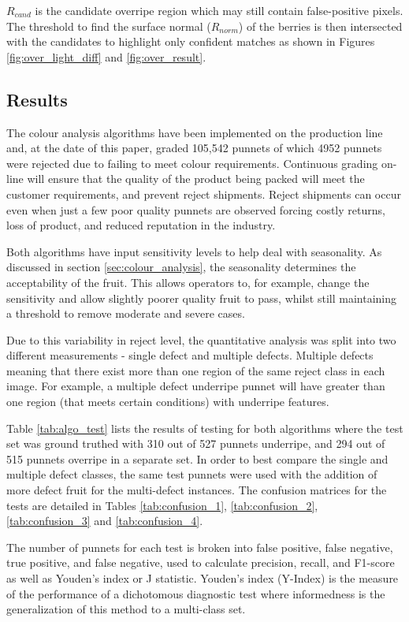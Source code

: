 \documentclass[fleqn,twoside]{article}
\begin{document}
$R_{cand}$ is the candidate overripe region which may still contain false-positive pixels. The threshold to find the surface normal ($R_{norm}$) of the berries is then intersected with the candidates to highlight only confident matches as shown in Figures \ref{fig:over_light_diff} and \ref{fig:over_result}.


\subsection{Results}


The colour analysis algorithms have been implemented on the production line and, at the date of this paper, graded 105,542 punnets of which 4952 punnets were rejected due to failing to meet colour requirements. Continuous grading on-line will ensure that the quality of the product being packed will meet the customer requirements, and prevent reject shipments. Reject shipments can occur even when just a few poor quality punnets are observed forcing costly returns, loss of product, and reduced reputation in the industry.


Both algorithms have input sensitivity levels to help deal with seasonality. As discussed in section \ref{sec:colour_analysis}, the seasonality determines the acceptability of the fruit. This allows operators to, for example, change the sensitivity and allow slightly poorer quality fruit to pass, whilst still maintaining a threshold to remove moderate and severe cases.

Due to this variability in reject level, the quantitative analysis was split into two different measurements - single defect and multiple defects. Multiple defects meaning that there exist more than one region of the same reject class in each image. For example, a multiple defect underripe punnet will have greater than one region (that meets certain conditions) with underripe features.

Table \ref{tab:algo_test} lists the results of testing for both algorithms where the test set was ground truthed with 310 out of 527 punnets underripe, and 294 out of 515 punnets overripe in a separate set. In order to best compare the single and multiple defect classes, the same test punnets were used with the addition of more defect fruit for the multi-defect instances. The confusion matrices for the tests are detailed in Tables \ref{tab:confusion_1},  \ref{tab:confusion_2}, \ref{tab:confusion_3} and \ref{tab:confusion_4}.

The number of punnets for each test is broken into false positive, false negative, true positive, and false negative, used to calculate precision, recall, and F1-score as well as Youden's index or J statistic. Youden's index (Y-Index) is the measure of the performance of a dichotomous diagnostic test where informedness is the generalization of this method to a multi-class set.
\end{document}
